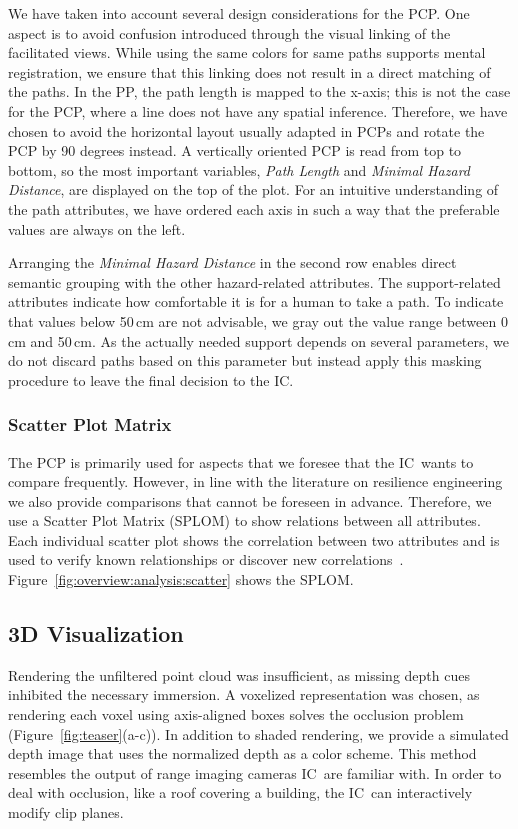 \documentclass{egpubl}
\def\IC{IC}
\begin{document}
We have taken into account several design considerations for the PCP. One aspect is to avoid confusion introduced through the visual linking of the facilitated views. While using the same colors for same paths supports mental registration, we ensure that this linking does not result in a direct matching of the paths. In the PP, the path length is mapped to the x-axis; this is not the case for the PCP, where a line does not have any spatial inference. Therefore, we have chosen to avoid the horizontal layout usually adapted in PCPs and rotate the PCP by 90 degrees instead. A vertically oriented PCP is read from top to bottom, so the most important variables, \emph{Path Length} and \emph{Minimal Hazard Distance}, are displayed on the top of the plot. For an intuitive understanding of the path attributes, we have ordered each axis in such a way that the preferable values are always on the left. 

Arranging the \emph{Minimal Hazard Distance} in the second row enables direct semantic grouping with the other hazard-related attributes. The support-related attributes indicate how comfortable it is for a human to take a path. To indicate that values below 50\,cm are not advisable, we gray out the value range between 0\,cm and 50\,cm. As the actually needed support depends on several parameters, we do not discard paths based on this parameter but instead apply this masking procedure to leave the final decision to the \IC .

\subsubsection{Scatter Plot Matrix} \label{sec:overview:analysis:scatter}
The PCP is primarily used for aspects that we foresee that the \IC\ wants to compare frequently. However, in line with the literature on resilience engineering~\cite{Lundberg2012} we also provide comparisons that cannot be foreseen in advance. Therefore, we use a Scatter Plot Matrix (SPLOM) to show relations between all attributes. Each individual scatter plot shows the correlation between two attributes and is used to verify known relationships or discover new correlations~\cite{Li2008}. Figure~\ref{fig:overview:analysis:scatter} shows the SPLOM.

\subsection{3D Visualization} \label{sec:overview:3dvisualization}
 Rendering the unfiltered point cloud was insufficient, as missing depth cues inhibited the necessary immersion. A voxelized representation was chosen, as rendering each voxel using axis-aligned boxes solves the occlusion problem (Figure~\ref{fig:teaser}(a-c)). In addition to shaded rendering, we provide a simulated depth image that uses the normalized depth as a color scheme. This method resembles the output of range imaging cameras \IC\ are familiar with. In order to deal with occlusion, like a roof covering a building, the \IC\ can interactively modify clip planes.
\end{document}
